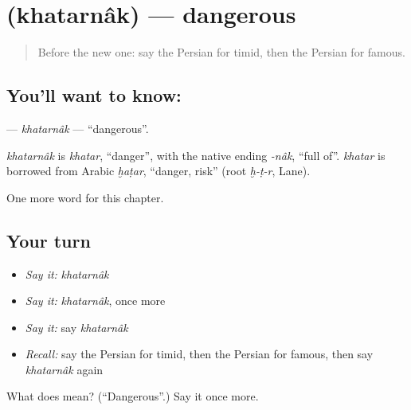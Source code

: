\section[\texorpdfstring{\fa{خطرناک} (khatarnâk)}{خطرناک (khatarnâk)}]{ (khatarnâk) — dangerous}

\label{lesson:FA-C126-khatarnak}



\begin{quote}
Before the new one: say the Persian for timid, then the Persian for famous.
\end{quote}

\subsection*{You'll want to know: }
\textbf{} — \emph{khatarnâk} — \textquotedblleft{}dangerous\textquotedblright{}.

\begin{cousinweb}
\emph{khatarnâk} is \emph{khatar}, \textquotedblleft{}danger\textquotedblright{}, with the native ending \emph{-nâk}, \textquotedblleft{}full of\textquotedblright{}. \emph{khatar} is borrowed from Arabic \emph{ḫaṭar}, \textquotedblleft{}danger, risk\textquotedblright{} (root \emph{ḫ-ṭ-r}, Lane).
\end{cousinweb}

\begin{grammarlens}[title={What you've built}]
One more word for this chapter.
\end{grammarlens}

\subsection*{Your turn}
\begin{itemize}
\raggedright
  \item \emph{Say it:} \emph{khatarnâk}
  \item \emph{Say it:} \emph{khatarnâk}, once more
  \item \emph{Say it:} say \emph{khatarnâk}
  \item \emph{Recall:} say the Persian for timid, then the Persian for famous, then say \emph{khatarnâk} again
\end{itemize}

\begin{tcolorbox}[breakable,colback=teal!4,colframe=teal!35!black,title={Before you move on}]
What does  mean? (\textquotedblleft{}Dangerous\textquotedblright{}.) Say it once more.
\end{tcolorbox}
